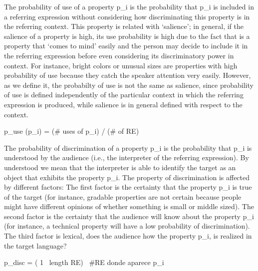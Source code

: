 The probability of use of a property p_i is the probability that p_i is included in a referring expression without considering how discriminating this property is in the referring context. This property is related with ‘salience’; in general, if the salience of a property is high, its use probability is high due to the fact that is a property that ‘comes to mind’ easily and the person may decide to include it in the referring expression before even considering its discriminatory power in context. For instance, bright colors or unusual sizes are properties with high probability of use because they catch the speaker attention very easily. However, as we define it, the probabilty of use is not the same as salience, since probability of use is defined independently of the particular context in which the referring expression is produced, while salience is in general defined with respect to the context. 

p_use (p_i) = (# uses of p_i) / (# of RE)
 
The probability of discrimination of a property p_i is the probability that p_i is understood by the audience (i.e., the interpreter of the referring expression). By understood we mean that the interpreter is able to identify the target as an object that exhibits the property p_i. The property of discrimination is affected by different factors: The first factor is the certainty that the property p_i is true of the target (for instance, gradable properties are not certain because people might have different opinions of whether something is small or middle sized). The second factor is the certainty that the audience will know about the property p_i (for instance, a technical property will have a low probability of discrimination). The third factor is lexical, does the audience how the property p_i, is realized in the target language?

p_disc = \sum ( 1 \ length RE) \ #RE donde aparece p_i


